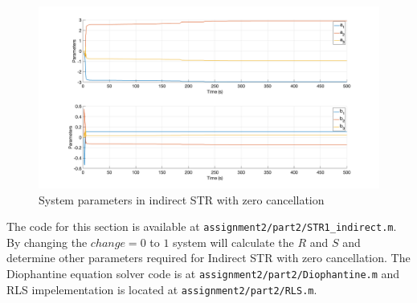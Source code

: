 \begin{figure}
	\centering
	\includegraphics[width=\textwidth]{images/str22.png}
	\caption{System parameters in indirect STR with zero cancellation}
	\label{fig:str22}
\end{figure}

The code  for this section is available at \lstinline|assignment2/part2/STR1_indirect.m|. By changing the $change=0$ to $1$ system will calculate the $R$ and $S$ and determine other parameters required for Indirect STR with zero cancellation. The Diophantine equation solver code is at \lstinline|assignment2/part2/Diophantine.m| and RLS impelementation is located at \lstinline|assignment2/part2/RLS.m|.
